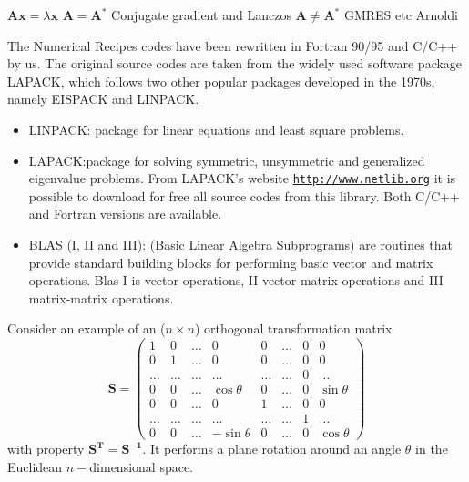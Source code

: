 \documentclass[%
oneside,                 %
final,                   %
10pt]{article}
\begin{document}

\newcommand{\exercisesection}[1]{\subsection*{#1}}



$\mathbf{A}\mathbf{x}=\lambda\mathbf{x}$ 
   $\mathbf{A}=\mathbf{A}^*$  Conjugate gradient and  Lanczos
  $\mathbf{A}\ne \mathbf{A}^*$  GMRES etc           Arnoldi 

The Numerical Recipes codes have been rewritten in Fortran 90/95 and C/C++ by us.
The original source codes are taken from the widely used software
package LAPACK, which follows two other popular packages developed in the 1970s, 
namely EISPACK and LINPACK.
\begin{itemize}
 \item LINPACK: package for linear equations  and least square problems.

 \item LAPACK:package for solving symmetric, unsymmetric and generalized eigenvalue problems. From LAPACK's website \href{{http://www.netlib.org}}{\nolinkurl{http://www.netlib.org}}  it is  possible to download for free all source codes from this library. Both C/C++ and Fortran versions are available.

 \item BLAS (I, II and III): (Basic Linear Algebra Subprograms)  are routines that provide standard building blocks for performing basic vector and matrix operations.   Blas I is vector operations, II vector-matrix operations and III matrix-matrix operations. 
\end{itemize}

\noindent
Consider an  example of an ($n\times n$) orthogonal transformation matrix 
\[
\mathbf{S}=
 \left( 
   \begin{array}{cccccccc}
   1  &    0  & \dots &   0        &    0  & \dots & 0 &   0       \\
   0  &    1  & \dots &   0        &    0  & \dots & 0 &   0       \\
\dots & \dots & \dots & \dots      & \dots & \dots & 0 & \dots     \\ 
   0  &    0  & \dots & \cos\theta  &    0  & \dots & 0 & \sin\theta \\
   0  &    0  & \dots &   0        &    1  & \dots & 0 &   0       \\
\dots & \dots & \dots & \dots      & \dots & \dots & 1 & \dots     \\
   0  &    0  & \dots &  -\sin\theta        &    0  & \dots & 0 &   \cos\theta   
   \end{array}
 \right)
\]
with property $\mathbf{S^{T}} = \mathbf{S^{-1}}$.
It performs a plane rotation around an angle $\theta$ in the Euclidean 
$n-$dimensional space. 
\end{document}
